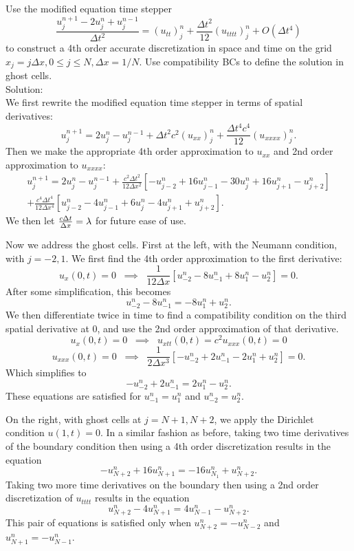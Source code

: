 \benum
\item Use the modified equation time stepper 
$$\frac{u_j^{n+1}-2u_j^n+u_j^{n-1}}{\Delta t^2}=(u_{tt})_j^n+\frac{\Delta t^2}{12}(u_{tttt})_j^n+O(\Delta t^4)$$
to construct a 4th order accurate discretization in space and time on the grid $x_j=j\Delta x, 0\leq j\leq N,\Delta x=1/N.$ Use compatibility BCs to define the solution in ghost cells.\\
Solution:\\
We first rewrite the modified equation time stepper in terms of spatial derivatives:
$$u_j^{n+1}=2u_j^n-u_j^{n-1}+\Delta t^2 c^2 (u_{xx})_j^n+\frac{\Delta t^4 c^4}{12}(u_{xxxx})_j^n.$$
Then we make the appropriate 4th order approximation to $u_{xx}$ and 2nd order approximation to $u_{xxxx}$:
\begin{multline*}
u_j^{n+1}=2u_j^n-u_j^{n-1}+\frac{c^2\Delta t^2}{12\Delta x^2}[-u_{j-2}^n+16u_{j-1}^n-30u_j^n+16u_{j+1}^n-u_{j+2}^n]\\
+\frac{c^4\Delta t^4 }{12\Delta x^4}[u_{j-2}^n-4u_{j-1}^n+6u_j^n-4u_{j+1}^n+u_{j+2}^n].
\end{multline*}
We then let $\frac{c\Delta t}{\Delta x}=\lambda$ for future ease of use.\\
\par Now we address the ghost cells. First at the left, with the Neumann condition, with $j=-2,1$. We first find the 4th order approximation to the first derivative:
$$u_x(0,t)=0\;\;\implies\;\; \frac{1}{12\Delta x}[u_{-2}^n-8 u_{-1}^n+8u_{1}^n-u_{2}^n]=0.$$
After some simplification, this becomes
$$u_{-2}^n-8 u_{-1}^n=-8u_{1}^n+u_{2}^n.$$
We then differentiate twice in time to find a compatibility condition on the third spatial derivative at 0, and use the 2nd order approximation of that derivative.
$$u_x(0,t)=0\;\;\implies\;\; u_{xtt}(0,t)=c^2u_{xxx}(0,t)=0$$
$$u_{xxx}(0,t)=0\;\;\implies\;\; \frac{1}{2\Delta x^3}[-u_{-2}^n+2u_{-1}^n-2u_{1}^n+u_{2}^n]=0.$$
Which simplifies to
$$-u_{-2}^n+2u_{-1}^n=2u_{1}^n-u_{2}^n.$$
These equations are satisfied for $u_{-1}^n=u_{1}^n$ and $u_{-2}^n=u_{2}^n$.\\
\par On the right, with ghost cells at $j=N+1,N+2$, we apply the Dirichlet condition $u(1,t)=0$. In a similar fashion as before, taking two time derivatives of the boundary condition then using a 4th order discretization results in the equation
$$-u_{N+2}^n+16 u_{N+1}^n=-16u_{N_1}^n+u_{N+2}^n.$$
Taking two more time derivatives on the boundary then using a 2nd order discretization of $u_{tttt}$ results in the equation
$$u_{N+2}^n-4 u_{N+1}^n=4u_{N-1}^n-u_{N+2}^n.$$
This pair of equations is satisfied only when $u_{N+2}^n=-u_{N-2}^n$ and $u_{N+1}^n=-u_{N-1}^n.$

